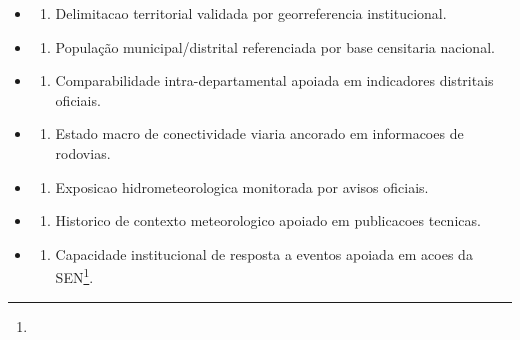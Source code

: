 {\begin{itemize}
\tightlist
\item
  \begin{enumerate}
  \def\labelenumi{\arabic{enumi})}
  \tightlist
  \item
    Delimitacao territorial validada por georreferencia institucional.
  \end{enumerate}
\item
  \begin{enumerate}
  \def\labelenumi{\arabic{enumi})}
  \setcounter{enumi}{1}
  \tightlist
  \item
    População municipal/\allowbreak distrital referenciada por base censitaria
    nacional.
  \end{enumerate}
\item
  \begin{enumerate}
  \def\labelenumi{\arabic{enumi})}
  \setcounter{enumi}{2}
  \tightlist
  \item
    Comparabilidade intra-departamental apoiada em indicadores
    distritais oficiais.
  \end{enumerate}
\item
  \begin{enumerate}
  \def\labelenumi{\arabic{enumi})}
  \setcounter{enumi}{3}
  \tightlist
  \item
    Estado macro de conectividade viaria ancorado em informacoes de
    rodovias.
  \end{enumerate}
\item
  \begin{enumerate}
  \def\labelenumi{\arabic{enumi})}
  \setcounter{enumi}{4}
  \tightlist
  \item
    Exposicao hidrometeorologica monitorada por avisos oficiais.
  \end{enumerate}
\item
  \begin{enumerate}
  \def\labelenumi{\arabic{enumi})}
  \setcounter{enumi}{5}
  \tightlist
  \item
    Historico de contexto meteorologico apoiado em publicacoes tecnicas.
  \end{enumerate}
\item
  \begin{enumerate}
  \def\labelenumi{\arabic{enumi})}
  \setcounter{enumi}{6}
  \tightlist
  \item
    Capacidade institucional de resposta a eventos apoiada em acoes da
    SEN\footnote{\fineSEN}.
  \end{enumerate}

\end{itemize}}
